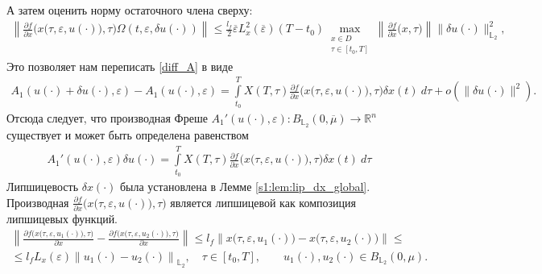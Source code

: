 \documentclass[../main.tex]{subfiles}
\begin{document}
А затем оценить норму остаточного члена сверху:
\begin{gather*}
 \left\| 
 \frac{\partial f}{\partial x} \Big(x\big(\tau,\varepsilon, u(\cdot)\big), \tau\Big) \Omega(t,\varepsilon, \delta u(\cdot)) 
 \right\| 
 \leqslant
 \frac{l_f}{2}
 \overline{\varepsilon} 
 L_x^2(\overline{\varepsilon})
 (T-t_0)
 \max_{\substack{x\in D \\ \tau \in [t_0,T]}} 
 \left\|\frac{\partial f}{\partial x} \Big(x, \tau\Big) \right\|
 \|\delta u(\cdot)\|_{\mathbb{L}_2}^2,
\end{gather*}
Это позволяет нам переписать \eqref{diff_A} в виде
\begin{gather}
 A_1(u(\cdot) + \delta u(\cdot),\varepsilon) - A_1(u(\cdot),\varepsilon) = \int\limits_{t_0}^T X(T,\tau) \frac{\partial f}{\partial x} \Big(x\big(\tau,\varepsilon, u(\cdot)\big), \tau\Big) \delta x(t) \ d\tau + o(\|\delta u(\cdot)\|^2).
\end{gather}
Отсюда следует, что производная Фреше $A_1'(u(\cdot),\varepsilon): B_{\mathbb{L}_2}(0,\overline{\mu}) \to \mathbb{R}^n $ существует и может быть определена равенством
\begin{gather}\label{A1_diff}
 A_1'(u(\cdot),\varepsilon)\delta u(\cdot) = \int\limits_{t_0}^T X(T,\tau) \frac{\partial f}{\partial x} \Big(x\big(\tau,\varepsilon, u(\cdot)\big), \tau\Big) \delta x(t) \ d\tau 
\end{gather}
Липшицевость $\delta x(\cdot)$ была установлена в Лемме \ref{s1:lem:lip_dx_global}. 
Производная $\frac{\partial f}{\partial x} \Big(x\big(\tau,\varepsilon, u(\cdot)\big),\tau\Big)$ является липшицевой как композиция липшицевых функций.
\begin{gather*}
 \left\| \frac{\partial f \Big(x\big(\tau,\varepsilon, u_1(\cdot)\big),\tau\Big)} {\partial x} - \frac{\partial f \Big(x\big(\tau,\varepsilon, u_2(\cdot)\big),\tau\Big)} {\partial x} \right\| \leqslant l_f \left\|x\big(\tau,\varepsilon, u_1(\cdot) \big) - x\big(\tau,\varepsilon, u_2(\cdot)\big) \right\| \leqslant \\ \leqslant l_f L_x(\varepsilon) \left\| u_1(\cdot) - u_2(\cdot) \right\|_{\mathbb{L}_2}, \quad \tau \in [t_0, T], \qquad u_1(\cdot), u_2(\cdot) \in B_{\mathbb{L}_2}(0,\mu).
\end{gather*}
\end{document}

